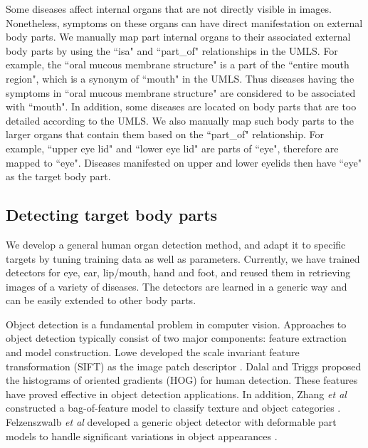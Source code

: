 Some diseases affect internal organs that are not directly visible in images. Nonetheless, symptoms on these organs can have direct manifestation on external body parts. We manually map part internal organs to their associated external body parts by using the ``isa" and ``part\_of" relationships in the UMLS. For example, the ``oral mucous membrane structure" is a part of the ``entire mouth region", which is a synonym of ``mouth" in the UMLS. Thus diseases having the symptoms in ``oral mucous membrane structure" are considered to be associated with ``mouth". In addition, some diseases are located on body parts that are too detailed according to the UMLS. We also manually map such body parts to the larger organs that contain them based on the ``part\_of" relationship. For example, ``upper eye lid" and ``lower eye lid" are parts of ``eye", therefore are mapped to ``eye". Diseases manifested on upper and lower eyelids then have ``eye" as the target body part.

\subsection{Detecting target body parts}
We develop a general human organ detection method, and adapt it to specific targets by tuning training data as well as parameters. Currently, we have trained detectors for eye, ear, lip/mouth, hand and foot, and reused them in retrieving images of a variety of diseases. The detectors are learned in a generic way and can be easily extended to other body parts.

Object detection is a fundamental problem in computer
vision. Approaches to object detection typically consist of two
major components: feature extraction and model construction.
Lowe developed the scale invariant feature transformation
(SIFT) as the image patch descriptor \cite{lowe1999object}.
Dalal and Triggs \cite{dalal2005histograms} proposed
the histograms of oriented gradients (HOG) for human
detection. These features have proved effective in object detection
applications. In addition, Zhang {\it et al} constructed a
bag-of-feature model to classify texture and object categories \cite{zhang2007local}.
Felzenszwalb {\it et al} developed a generic object detector with
deformable part models to handle significant variations in object
appearances \cite{felzenszwalb2010object}.


